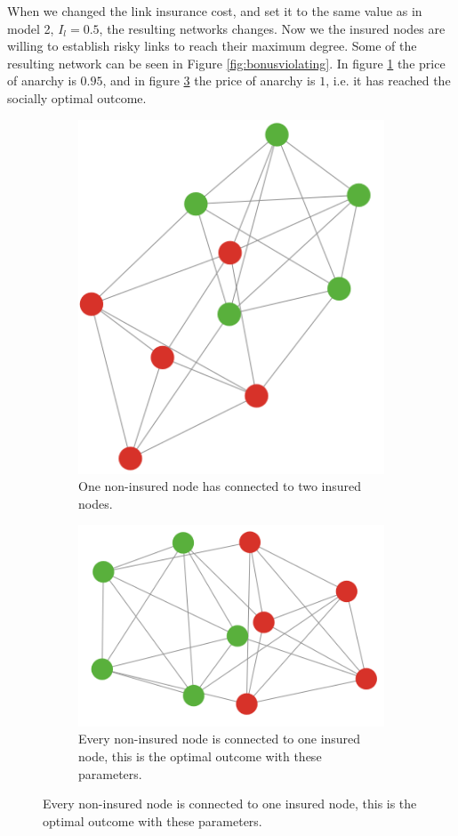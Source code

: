 When we changed the link insurance cost, and set it to the same value as in model 2, $I_{l}=0.5$, the resulting networks changes. Now we the insured nodes are willing to establish risky links to reach their maximum degree. Some of the resulting network can be seen in Figure \ref{fig:bonusviolating}.
In figure \ref{fig:bonusvolating:a} the price of anarchy is $0.95$, and in figure \ref{fig:bonusvolating:b} the price of anarchy is $1$, i.e. it has reached the socially optimal outcome.
\begin{figure}[t]
\centering
\begin{subfigure}{.5\textwidth}
  \centering
  \includegraphics[width=0.9\linewidth]{../Figures/BonusGameViolating.png}
  \caption{\label{fig:bonusvolating:a} One non-insured node has connected to two insured nodes.}
\end{subfigure}
\quad
\begin{subfigure}{.5\textwidth}
  \centering
  \includegraphics[width=0.9\linewidth]{../Figures/BonusGameViolatingOptimal.png}
  \caption{\label{fig:bonusvolating:b}Every non-insured node is connected to one insured node, this is the optimal outcome with these parameters.}
\end{subfigure}
  

\end{figure}
